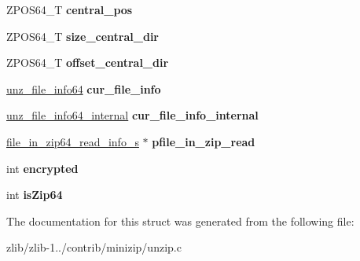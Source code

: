 \begin{DoxyCompactItemize}
\item 
\hypertarget{structunz64__s_a9ac60525f108ba995ccf46b85d8e80f5}{Z\+P\+O\+S64\+\_\+\+T {\bfseries central\+\_\+pos}}\label{structunz64__s_a9ac60525f108ba995ccf46b85d8e80f5}

\item 
\hypertarget{structunz64__s_ac20ff22a6956f082e88204c72d4fdda1}{Z\+P\+O\+S64\+\_\+\+T {\bfseries size\+\_\+central\+\_\+dir}}\label{structunz64__s_ac20ff22a6956f082e88204c72d4fdda1}

\item 
\hypertarget{structunz64__s_abef1ed5574b24559f6601268aa0d44aa}{Z\+P\+O\+S64\+\_\+\+T {\bfseries offset\+\_\+central\+\_\+dir}}\label{structunz64__s_abef1ed5574b24559f6601268aa0d44aa}

\item 
\hypertarget{structunz64__s_a2c0f02f769c43e2c351e310ff130f1c0}{\hyperlink{structunz__file__info64__s}{unz\+\_\+file\+\_\+info64} {\bfseries cur\+\_\+file\+\_\+info}}\label{structunz64__s_a2c0f02f769c43e2c351e310ff130f1c0}

\item 
\hypertarget{structunz64__s_aaf5f19b9e41e86ccde7a2d7802622bf6}{\hyperlink{structunz__file__info64__internal__s}{unz\+\_\+file\+\_\+info64\+\_\+internal} {\bfseries cur\+\_\+file\+\_\+info\+\_\+internal}}\label{structunz64__s_aaf5f19b9e41e86ccde7a2d7802622bf6}

\item 
\hypertarget{structunz64__s_ab4f7635123807366457df79da8d59934}{\hyperlink{structfile__in__zip64__read__info__s}{file\+\_\+in\+\_\+zip64\+\_\+read\+\_\+info\+\_\+s} $\ast$ {\bfseries pfile\+\_\+in\+\_\+zip\+\_\+read}}\label{structunz64__s_ab4f7635123807366457df79da8d59934}

\item 
\hypertarget{structunz64__s_ae1c0c073c67b119d6ba21ea2678ea513}{int {\bfseries encrypted}}\label{structunz64__s_ae1c0c073c67b119d6ba21ea2678ea513}

\item 
\hypertarget{structunz64__s_afd7f9f28081943e01294bc4bf6f36e7b}{int {\bfseries is\+Zip64}}\label{structunz64__s_afd7f9f28081943e01294bc4bf6f36e7b}

\end{DoxyCompactItemize}


The documentation for this struct was generated from the following file\+:\begin{DoxyCompactItemize}
\item 
zlib/zlib-\/1../contrib/minizip/unzip.\+c\end{DoxyCompactItemize}

